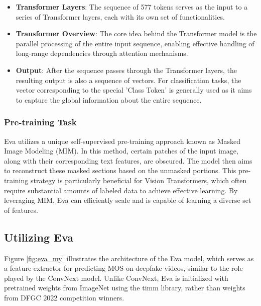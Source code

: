 \documentclass[a4paper,12pt,openright]{book}
\begin{document}
\begin{itemize}
    

    \item \textbf{Transformer Layers}: The sequence of 577 tokens serves as the input to a series of Transformer layers, each with its own set of functionalities.
    

    \item \textbf{Transformer Overview}: 
    The core idea behind the Transformer model is the parallel processing of the entire input sequence, enabling effective handling of long-range dependencies through attention mechanisms.
    
    \item \textbf{Output}: 
    After the sequence passes through the Transformer layers, the resulting output is also a sequence of vectors. For classification tasks, the vector corresponding to the special 'Class Token' is generally used as it aims to capture the global information about the entire sequence.
\end{itemize}



\subsubsection{Pre-training Task}
\label{subsubsec:eva_pretraining}

Eva utilizes a unique self-supervised pre-training approach known as Masked Image Modeling (MIM). In this method, certain patches of the input image, along with their corresponding text features, are obscured. The model then aims to reconstruct these masked sections based on the unmasked portions. This pre-training strategy is particularly beneficial for Vision Transformers, which often require substantial amounts of labeled data to achieve effective learning. By leveraging MIM, Eva can efficiently scale and is capable of learning a diverse set of features. 

\newpage

\subsection{Utilizing Eva}

Figure \ref{fig:eva_my} illustrates the architecture of the Eva model, which serves as a feature extractor for predicting MOS on deepfake videos, similar to the role played by the ConvNext model. Unlike ConvNext, Eva is initialized with pretrained weights from ImageNet using the timm library, rather than weights from DFGC 2022 competition winners.
\end{document}
